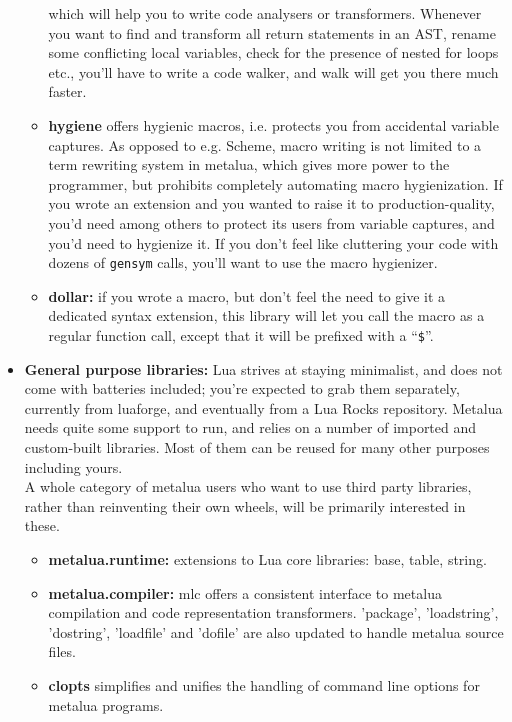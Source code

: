 \begin{itemize}
\begin{itemize}
    which will help you to write code analysers or transformers. Whenever you
    want to find and transform all return statements in an AST, rename some
    conflicting local variables, check for the presence of nested for loops
    etc., you'll have to write a code walker, and walk will get you there much
    faster. 
  \item{\bf hygiene} offers hygienic macros, i.e. protects you from accidental
    variable captures. As opposed to e.g. Scheme, macro writing is not limited
    to a term rewriting system in metalua, which gives more power to the
    programmer, but prohibits completely automating macro hygienization. If
    you wrote an extension and you wanted to raise it to production-quality,
    you'd need among others to protect its users from variable captures, and
    you'd need to hygienize it. If you don't feel like cluttering your code
    with dozens of {\tt gensym} calls, you'll want to use the macro hygienizer.
  \item{\bf dollar:} if you wrote a macro, but don't feel the need to give it a
    dedicated syntax extension, this library will let you call the macro as a
    regular function call, except that it will be prefixed with a ``{\tt\$}''.
  \end{itemize}
  \item{\bf General purpose libraries:} Lua strives at staying minimalist, and does
    not come with batteries included; you're expected to grab them separately,
    currently from luaforge, and eventually from a Lua Rocks repository. Metalua
    needs quite some support to run, and relies on a number of imported and
    custom-built libraries. Most of them can be reused for many other purposes
    including yours.\\
    A whole category of metalua users who want to use third party libraries,
    rather than reinventing their own wheels, will be primarily interested in
    these.
    \begin{itemize}
    \item{\bf metalua.runtime:} extensions to Lua core libraries: base, table,
      string.
    \item{\bf metalua.compiler:} mlc offers a consistent interface to metalua
      compilation and code representation transformers. 'package', 'loadstring',
      'dostring', 'loadfile' and 'dofile' are also updated to handle metalua
      source files.
    \item{\bf clopts} simplifies and unifies the handling of command line options
      for metalua programs.

\end{itemize}
\end{itemize}
